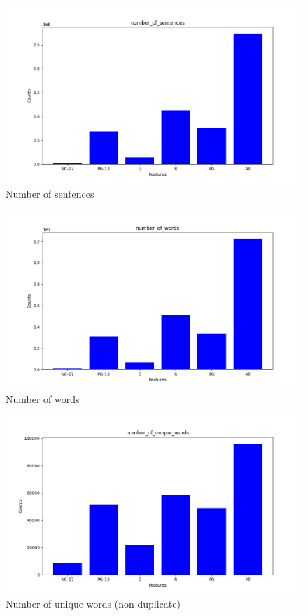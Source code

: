 \documentclass[a4paper]{article}
\begin{document}
\begin{figure}[ht]
    \centering
    \includegraphics[width=1\textwidth]{../stats/number_of_sentences.png}
    \caption{Number of sentences}
\end{figure}

\begin{figure}[ht]
    \centering
    \includegraphics[width=1\textwidth]{../stats/number_of_words.png}
    \caption{Number of words}
\end{figure}

\begin{figure}[ht]
    \centering
    \includegraphics[width=1\textwidth]{../stats/number_of_unique_words.png}
    \caption{Number of unique words (non-duplicate)}
\end{figure}
\end{document}
